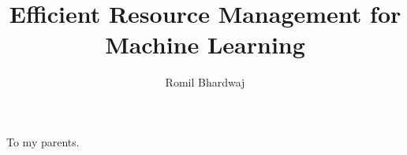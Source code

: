 \documentclass[oldfontcommands]{ucbthesis}
\begin{document}
	
	
	\title{Efficient Resource Management for Machine Learning}
	\author{Romil Bhardwaj}
	
	\maketitle
	\copyrightpage
	
	
	
	\begin{frontmatter}
		
		\begin{dedication}
			\null\vfil
			\begin{center}
				To my parents.
			\end{center}
			\vfil\null
		\end{dedication}
		
		
		\tableofcontents
		\clearpage
		\listoffigures
		\clearpage
		\listoftables
		
		
		
	\end{frontmatter}
	
\end{document}
